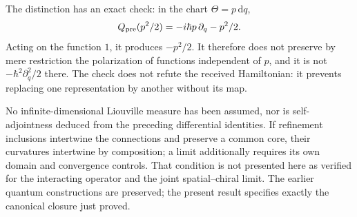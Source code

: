 The distinction has an exact check: in the chart \(\Theta=p\,\mathrm dq\),
\begin{equation}
 Q_{\rm pre}(p^2/2)=-i\hbar p\,\partial_q-p^2/2.
 \label{hmtcuatro:control-polarizacion}
\end{equation}
Acting on the function \(1\), it produces \(-p^2/2\). It therefore does not preserve by mere restriction the polarization of functions independent of \(p\), and it is not \(-\hbar^2\partial_q^2/2\) there. The check does not refute the received Hamiltonian: it prevents replacing one representation by another without its map.

No infinite-dimensional Liouville measure has been assumed, nor is self-adjointness deduced from the preceding differential identities. If refinement inclusions intertwine the connections and preserve a common core, their curvatures intertwine by composition; a limit additionally requires its own domain and convergence controls. That condition is not presented here as verified for the interacting operator and the joint spatial--chiral limit. The earlier quantum constructions are preserved; the present result specifies exactly the canonical closure just proved.
